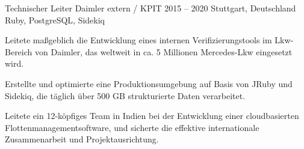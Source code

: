 \cvexperience
  {Technischer Leiter}
  {Daimler extern / KPIT}
  {2015 -- 2020}
  {Stuttgart, Deutschland}
  {Ruby, PostgreSQL, Sidekiq}
  {%
    \item Leitete maßgeblich die Entwicklung eines internen Verifizierungstools im Lkw-Bereich von Daimler, das weltweit in ca. 5 Millionen Mercedes-Lkw eingesetzt wird.
    \item Erstellte und optimierte eine Produktionsumgebung auf Basis von JRuby und Sidekiq, die täglich über 500 GB strukturierte Daten verarbeitet.
    \item Leitete ein 12-köpfiges Team in Indien bei der Entwicklung einer cloudbasierten Flottenmanagementsoftware, und sicherte die effektive internationale Zusammenarbeit und Projektausrichtung.
  }
